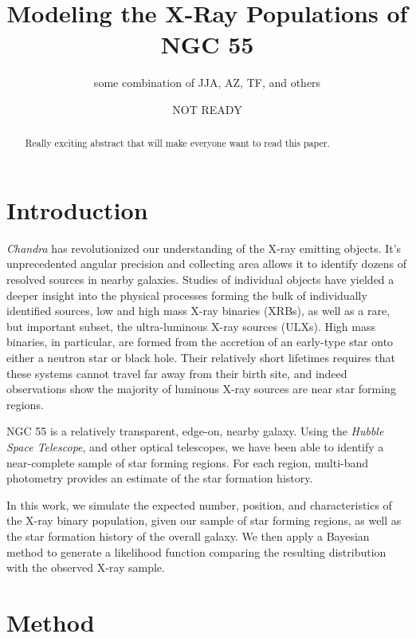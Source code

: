 \documentclass[12pt, preprint]{aastex}
\begin{document}
\title{Modeling the X-Ray Populations of NGC 55}
\author{some combination of JJA, AZ, TF, and others}
\date{NOT READY}

\begin{abstract}
Really exciting abstract that will make everyone want to read this paper.
\end{abstract}

\section{Introduction}

{\it Chandra} has revolutionized our understanding of the X-ray emitting objects. It's unprecedented angular precision and collecting area allows it to identify dozens of resolved sources in nearby galaxies. Studies of individual objects have yielded a deeper insight into the physical processes forming the bulk of individually identified sources, low and high mass X-ray binaries (XRBs), as well as a rare, but important subset, the ultra-luminous X-ray sources (ULXs). High mass binaries, in particular, are formed from the accretion of an early-type star onto either a neutron star or black hole. Their relatively short lifetimes requires that these systems cannot travel far away from their birth site, and indeed observations show the majority of luminous X-ray sources are near star forming regions. 

NGC 55 is a relatively transparent, edge-on, nearby galaxy. Using the {\it Hubble Space Telescope}, and other optical telescopes, we have been able to identify a near-complete sample of star forming regions. For each region, multi-band photometry provides an estimate of the star formation history. 

In this work, we simulate the expected number, position, and characteristics of the X-ray binary population, given our sample of star forming regions, as well as the star formation history of the overall galaxy. We then apply a Bayesian method to generate a likelihood function comparing the resulting distribution with the observed X-ray sample.

\section{Method}
\end{document}

